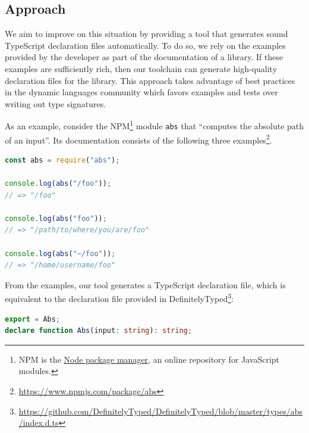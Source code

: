\documentclass[english,cleveref,autoref,submission]{programming}
\begin{document}
\subsection{Approach}
\label{sec:approach}


We aim to improve on this situation by providing a tool that generates
sound TypeScript declaration files automatically. To do so, we rely on the examples provided
by the developer as part of the documentation of a library. If these
examples are sufficiently rich, then our toolchain can generate
high-quality declaration files for the library. This approach takes
advantage of 
best practices in the dynamic languages community which favors
examples and tests over writing out type signatures.

As an example, consider the NPM\footnote{NPM is the \href{https://www.npmjs.com/}{Node package
  manager}, an online repository for JavaScript modules.} module
\texttt{abs} that
``computes the absolute path of an input''. Its documentation consists
of the following three examples\footnote{\url{https://www.npmjs.com/package/abs}}.
\begin{lstlisting}[language=JavaScript,numbers=none]
const abs = require("abs");
 
console.log(abs("/foo"));
// => "/foo"
 
console.log(abs("foo"));
// => "/path/to/where/you/are/foo"
 
console.log(abs("~/foo"));
// => "/home/username/foo"
\end{lstlisting}
From the examples, our tool generates a TypeScript declaration file,
which is equivalent to the declaration file provided in
DefinitelyTyped\footnote{\url{https://github.com/DefinitelyTyped/DefinitelyTyped/blob/master/types/abs/index.d.ts}}: 
\begin{lstlisting}[language=TypeScript,numbers=none]
export = Abs;
declare function Abs(input: string): string;
\end{lstlisting}
\end{document}
